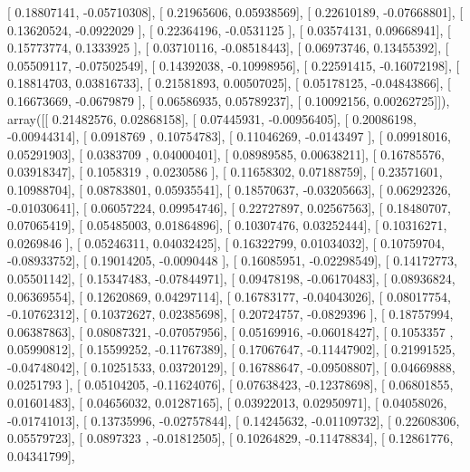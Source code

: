 \documentclass{article}
\begin{document}
       [ 0.18807141, -0.05710308],
       [ 0.21965606,  0.05938569],
       [ 0.22610189, -0.07668801],
       [ 0.13620524, -0.0922029 ],
       [ 0.22364196, -0.0531125 ],
       [ 0.03574131,  0.09668941],
       [ 0.15773774,  0.1333925 ],
       [ 0.03710116, -0.08518443],
       [ 0.06973746,  0.13455392],
       [ 0.05509117, -0.07502549],
       [ 0.14392038, -0.10998956],
       [ 0.22591415, -0.16072198],
       [ 0.18814703,  0.03816733],
       [ 0.21581893,  0.00507025],
       [ 0.05178125, -0.04843866],
       [ 0.16673669, -0.0679879 ],
       [ 0.06586935,  0.05789237],
       [ 0.10092156,  0.00262725]]), array([[ 0.21482576,  0.02868158],
       [ 0.07445931, -0.00956405],
       [ 0.20086198, -0.00944314],
       [ 0.0918769 ,  0.10754783],
       [ 0.11046269, -0.0143497 ],
       [ 0.09918016,  0.05291903],
       [ 0.0383709 ,  0.04000401],
       [ 0.08989585,  0.00638211],
       [ 0.16785576,  0.03918347],
       [ 0.1058319 ,  0.0230586 ],
       [ 0.11658302,  0.07188759],
       [ 0.23571601,  0.10988704],
       [ 0.08783801,  0.05935541],
       [ 0.18570637, -0.03205663],
       [ 0.06292326, -0.01030641],
       [ 0.06057224,  0.09954746],
       [ 0.22727897,  0.02567563],
       [ 0.18480707,  0.07065419],
       [ 0.05485003,  0.01864896],
       [ 0.10307476,  0.03252444],
       [ 0.10316271,  0.0269846 ],
       [ 0.05246311,  0.04032425],
       [ 0.16322799,  0.01034032],
       [ 0.10759704, -0.08933752],
       [ 0.19014205, -0.0090448 ],
       [ 0.16085951, -0.02298549],
       [ 0.14172773,  0.05501142],
       [ 0.15347483, -0.07844971],
       [ 0.09478198, -0.06170483],
       [ 0.08936824,  0.06369554],
       [ 0.12620869,  0.04297114],
       [ 0.16783177, -0.04043026],
       [ 0.08017754, -0.10762312],
       [ 0.10372627,  0.02385698],
       [ 0.20724757, -0.0829396 ],
       [ 0.18757994,  0.06387863],
       [ 0.08087321, -0.07057956],
       [ 0.05169916, -0.06018427],
       [ 0.1053357 ,  0.05990812],
       [ 0.15599252, -0.11767389],
       [ 0.17067647, -0.11447902],
       [ 0.21991525, -0.04748042],
       [ 0.10251533,  0.03720129],
       [ 0.16788647, -0.09508807],
       [ 0.04669888,  0.0251793 ],
       [ 0.05104205, -0.11624076],
       [ 0.07638423, -0.12378698],
       [ 0.06801855,  0.01601483],
       [ 0.04656032,  0.01287165],
       [ 0.03922013,  0.02950971],
       [ 0.04058026, -0.01741013],
       [ 0.13735996, -0.02757844],
       [ 0.14245632, -0.01109732],
       [ 0.22608306,  0.05579723],
       [ 0.0897323 , -0.01812505],
       [ 0.10264829, -0.11478834],
       [ 0.12861776,  0.04341799],
\end{document}
